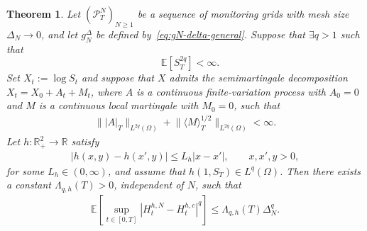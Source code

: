 \documentclass[10pt,a4paper]{amsart}
\newtheorem{theorem}{Theorem}
\begin{document}
\begin{theorem}\label{thm:lipschitz-payoff-convergence-rate}
    Let $(\mathcal P_T^N)_{N\geq1}$ be a sequence of monitoring grids with mesh size $\Delta_N\to0$, and let $g_N^\Delta$ be defined by~\eqref{eq:gN-delta-general}. Suppose that $\exists q>1$ such that
    \[
        \quad \mathbb E[S_T^{2q}]<\infty.
    \]
    Set $X_t:=\log S_t$ and suppose that $X$ admits the semimartingale decomposition $X_t=X_0+A_t+M_t$, where $A$ is a continuous finite-variation process with $A_0=0$ and $M$ is a continuous local martingale with $M_0=0$, such that
    \begin{align}\label{eq:log-semimartingale-rate-assumption}
        \big\||A|_T\big\|_{L^{2q}(\Omega)} + \big\|\langle M\rangle_T^{1/2}\big\|_{L^{2q}(\Omega)} < \infty.
    \end{align}
    Let $h:\mathbb R_+^2\longrightarrow \mathbb R$ satisfy
    \begin{align}\label{eq:lipschitz-first-variable}
        |h(x,y)-h(x',y)| \leq L_h|x-x'|, \qquad x,x',y>0,
    \end{align}
    for some $L_h \in (0,\infty)$, and assume that $h(1,S_T)\in L^q(\Omega)$. Then there exists a constant $\Lambda_{q,h}(T)>0$, independent of $N$, such that
    \begin{align}\label{eq:lipschitz-price-process-rate}
        \mathbb E\left[ \sup_{t\in[0,T]} |H_t^{h,N}-H_t^{h,c}|^q \right] \leq \Lambda_{q,h}(T)\Delta_N^q.
    \end{align}
\end{theorem}
\end{document}
